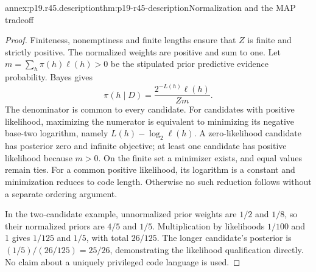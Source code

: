 \begin{annexitem}{annex:p19.r45.description}{thm:p19-r45-description}{Normalization and the MAP tradeoff}
\begin{proof}
Finiteness, nonemptiness and finite lengths ensure that \(Z\) is finite
and strictly positive. The normalized weights are positive and sum to
one. Let \(m=\sum_h\pi(h)\ell(h)>0\) be the stipulated prior
predictive evidence probability. Bayes gives
\[
 \pi(h\mid D)=\frac{2^{-L(h)}\ell(h)}{Zm}.
\]
The denominator is common to every candidate. For candidates with
positive likelihood, maximizing the numerator is equivalent to
minimizing its negative base-two logarithm, namely
\(L(h)-\log_2\ell(h)\). A zero-likelihood candidate has posterior
zero and infinite objective; at least one candidate has positive
likelihood because \(m>0\). On the finite set a minimizer exists,
and equal values remain ties. For a common positive likelihood, its
logarithm is a constant and minimization reduces to code length.
Otherwise no such reduction follows without a separate ordering
argument.

In the two-candidate example, unnormalized prior weights are
\(1/2\) and \(1/8\), so their normalized priors are \(4/5\)
and \(1/5\). Multiplication by likelihoods \(1/100\) and 1 gives
\(1/125\) and \(1/5\), with total \(26/125\). The longer
candidate's posterior is \((1/5)/(26/125)=25/26\), demonstrating
the likelihood qualification directly. No claim about a uniquely
privileged code language is used.
\end{proof}
\end{annexitem}

